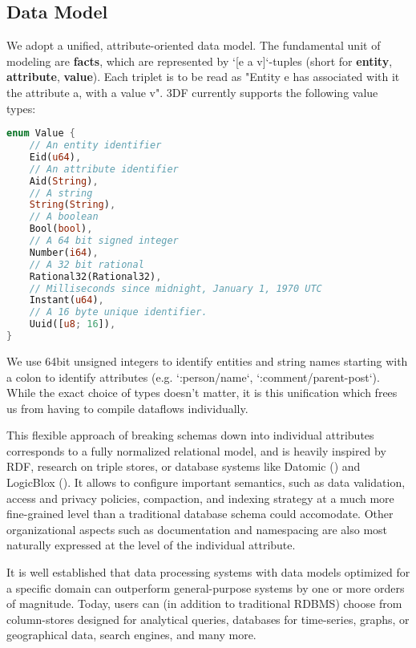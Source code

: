 \documentclass[../index.tex]{subfiles}
\begin{document}
\subsection{Data Model}

We adopt a unified, attribute-oriented data model. The fundamental
unit of modeling are \textbf{facts}, which are represented by `[e a
  v]`-tuples (short for \textbf{entity}, \textbf{attribute},
\textbf{value}). Each triplet is to be read as "Entity e has
associated with it the attribute a, with a value v". 3DF currently
supports the following value types:

\begin{lstlisting}[language=Rust, style=colouredRust]
enum Value {
    // An entity identifier
    Eid(u64),
    // An attribute identifier
    Aid(String),
    // A string
    String(String),
    // A boolean
    Bool(bool),
    // A 64 bit signed integer
    Number(i64),
    // A 32 bit rational
    Rational32(Rational32),
    // Milliseconds since midnight, January 1, 1970 UTC
    Instant(u64),
    // A 16 byte unique identifier.
    Uuid([u8; 16]),
}
\end{lstlisting}

We use 64bit unsigned integers to identify entities and string names
starting with a colon to identify attributes (e.g. `:person/name`,
`:comment/parent-post`). While the exact choice of types doesn't
matter, it is this unification which frees us from having to compile
dataflows individually.

This flexible approach of breaking schemas down into individual
attributes corresponds to a fully normalized relational model, and is
heavily inspired by RDF, research on triple stores, or database
systems like Datomic (\cite{datomic}) and LogicBlox
(\cite{aref2015design}). It allows to configure important semantics,
such as data validation, access and privacy policies, compaction, and
indexing strategy at a much more fine-grained level than a traditional
database schema could accomodate. Other organizational aspects such as
documentation and namespacing are also most naturally expressed at the
level of the individual attribute.

It is well established that data processing systems with data models
optimized for a specific domain can outperform general-purpose systems
by one or more orders of magnitude. Today, users can (in addition to
traditional RDBMS) choose from column-stores designed for analytical
queries, databases for time-series, graphs, or geographical data,
search engines, and many more.
\end{document}
